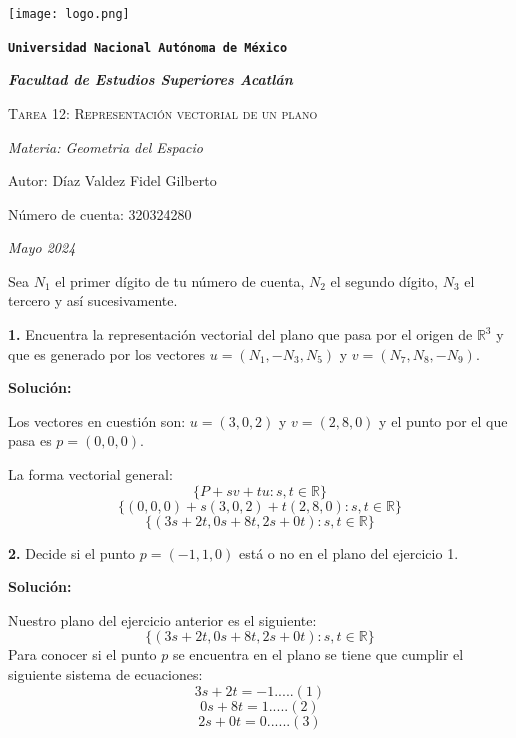 \documentclass{article}
\begin{document}
\begin{titlepage}
    \centering   
    {\texttt{[image: logo.png]}\par}
    {\texttt{\bfseries \LARGE Universidad Nacional Autónoma de México} \par}
    \vspace{1cm}
    {\itshape \Large \bfseries Facultad de Estudios Superiores Acatlán \par}
    \vspace{3cm}
    {\scshape \Huge Tarea 12: Representación vectorial de un plano\par}
    \vspace {3cm}
    {\slshape \Large Materia: Geometria del Espacio \par}
    \vspace{2cm}
    {\Large Autor: Díaz Valdez Fidel Gilberto\par}
    {\Large Número de cuenta: 320324280\par}
    \vfill
    {\itshape Mayo 2024 \par}
\end{titlepage}
Sea $N_1$ el primer dígito de tu número de cuenta, $N_2$ el segundo dígito, $N_3$ el tercero y así
sucesivamente.
\vspace{10pt}

\textbf{1.} Encuentra la representación vectorial del plano que pasa por el origen de $\mathbb{R}^3$ y que es generado por los 
vectores $u = (N_1, -N_3, N_5)$ y $v = (N_7, N_8, -N_9)$.
\vspace{10pt}

\textbf{Solución:}
\vspace{10pt}

Los vectores en cuestión son: $u = (3, 0, 2)$ y $v = (2, 8, 0)$ y el punto por el que pasa es $p=(0,0,0)$.

La forma vectorial general: 
$$\{P+sv+tu: s,t \in \mathbb{R}\}$$
$$\{(0,0,0)+s(3,0,2)+t(2,8,0): s,t \in \mathbb{R}\}$$
$$\{(3s+2t,0s+8t,2s+0t): s,t \in \mathbb{R}\}$$
\vspace{10pt}

\textbf{2.} Decide si el punto $p =(-1,1,0)$ está o no en el plano del ejercicio 1.
\vspace{10pt}

\textbf{Solución:}
\vspace{10pt}

Nuestro plano del ejercicio anterior es el siguiente:
$$\{(3s+2t,0s+8t,2s+0t): s,t \in \mathbb{R}\}$$
Para conocer si el punto $p$ se encuentra en el plano se tiene que cumplir el siguiente sistema de ecuaciones:
$$3s+2t = -1.....(1)$$
$$0s+8t = 1.....(2)$$
$$2s +0t = 0......(3)$$
\end{document}
